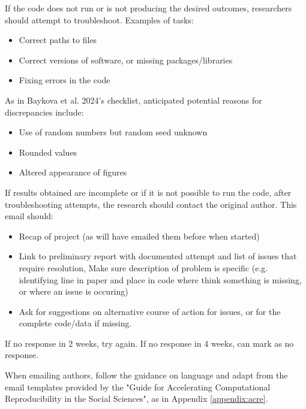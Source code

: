 
If the code does not run or is not producing the desired outcomes, researchers should attempt to troubleshoot. Examples of tasks:
\begin{itemize}
    \item Correct paths to files
    \item Correct versions of software, or missing packages/libraries
    \item Fixing errors in the code
\end{itemize}

As in Baykova et al. 2024's checklist,\autocite{baykova_ensuring_2024} anticipated potential reasons for discrepancies include:
\begin{itemize}
    \item Use of random numbers but random seed unknown
    \item Rounded values
    \item Altered appearance of figures
\end{itemize}

If results obtained are incomplete or if it is not possible to run the code, after troubleshooting attempts, the research should contact the original author. This email should:
\begin{itemize}
    \item Recap of project (as will have emailed them before when started)
    \item Link to preliminary report with documented attempt and list of issues that require resolution, Make sure description of problem is specific (e.g. identifying line in paper and place in code where think something is missing, or where an issue is occuring)
    \item Ask for suggestions on alternative course of action for issues, or for the complete code/data if missing.
\end{itemize}

If no response in 2 weeks, try again. If no response in 4 weeks, can mark as no response.

When emailing authors, follow the guidance on language and adapt from the email templates provided by the "Guide for Accelerating Computational Reproducibility in the Social Sciences",\autocite{berkeley_initiative_for_transparency_in_the_social_sciences_guide_2022} as in Appendix \ref{appendix:acre}.

